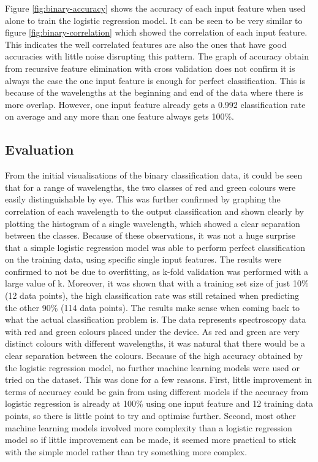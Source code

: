 \documentclass{article}
\begin{document}
\noindent
Figure \ref{fig:binary-accuracy} shows the accuracy of each input feature when used alone to train the logistic regression model. It can be seen to be very similar to figure \ref{fig:binary-correlation} which showed the correlation of each input feature. This indicates the well correlated features are also the ones that have good accuracies with little noise disrupting this pattern. The graph of accuracy obtain from recursive feature elimination with cross validation does not confirm it is always the case the one input feature is enough for perfect classification. This is because of the wavelengths at the beginning and end of the data where there is more overlap. However, one input feature already gets a 0.992 classification rate on average and any more than one feature always gets 100\%. 

\subsection{Evaluation}
From the initial visualisations of the binary classification data, it could be seen that for a range of wavelengths, the two classes of red and green colours were easily distinguishable by eye. This was further confirmed by graphing the correlation of each wavelength to the output classification and shown clearly by plotting the histogram of a single wavelength, which showed a clear separation between the classes. Because of these observations, it was not a huge surprise that a simple logistic regression model was able to perform perfect classification on the training data, using specific single input features. The results were confirmed to not be due to overfitting, as k-fold validation was performed with a large value of k. Moreover, it was shown that with a training set size of just 10\% (12 data points), the high classification rate was still retained when predicting the other 90\% (114 data points).
\n
The results make sense when coming back to what the actual classification problem is. The data represents spectroscopy data with red and green colours placed under the device. As red and green are very distinct colours with different wavelengths, it was natural that there would be a clear separation between the colours.
\n
Because of the high accuracy obtained by the logistic regression model, no further machine learning models were used or tried on the dataset. This was done for a few reasons. First, little improvement in terms of accuracy could be gain from using different models if the accuracy from logistic regression is already at 100\% using one input feature and 12 training data points, so there is little point to try and optimise further. Second, most other machine learning models involved more complexity than a logistic regression model so if little improvement can be made, it seemed more practical to stick with the simple model rather than try something more complex.
\end{document}
